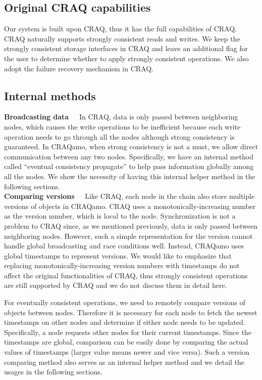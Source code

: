 \subsection{Original CRAQ capabilities}
Our system is built upon CRAQ, thus it has the full capabilities of CRAQ. CRAQ naturally supports strongly consistent reads and writes. We keep the strongly consistent storage interfaces in CRAQ and leave an additional flag for the user to determine whether to apply strongly consistent operations. We also adopt the failure recovery mechanism in CRAQ.

\subsection{Internal methods}
{\noindent \bf Broadcasting data\ \ } In CRAQ, data is only passed between neighboring nodes, which causes the write operations to be inefficient because each write operation needs to go through all the nodes although strong consistency is guaranteed. In CRAQamo, when strong consistency is not a must, we allow direct communication between any two nodes. Specifically, we have an internal method called ``eventual consistency propagate'' to help pass information globally among all the nodes. We show the necessity of having this internal helper method in the following sections. \\

{\noindent \bf Comparing versions\ \ } Like CRAQ, each node in the chain also store multiple versions of objects in CRAQamo. CRAQ uses a monotonically-increasing number as the version number, which is local to the node. Synchronization is not a problem to CRAQ since, as we mentioned previously, data is only passed between neighboring nodes. However, such a simple representation for the version cannot handle global broadcasting and race conditions well. Instead, CRAQamo uses global timestamps to represent versions. We would like to emphasize that replacing monotonically-increasing version numbers with timestamps do not affect the original functionalities of CRAQ, thus strongly consistent operations are still supported by CRAQ and we do not discuss them in detail here.

For eventually consistent operations, we need to remotely compare versions of objects between nodes. Therefore it is necessary for each node to fetch the newest timestamps on other nodes and determine if either node needs to be updated. Specifically, a node requests other nodes for their current timestamps. Since the timestamps are global, comparison can be easily done by comparing the actual values of timestamps (larger value means newer and vice versa). Such a version comparing method also serves as an internal helper method and we detail the usages in the following sections. 

